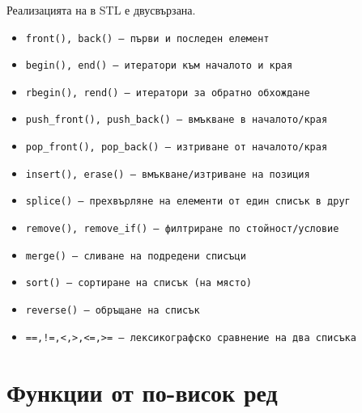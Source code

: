 \documentclass[alsotrans,beameroptions={aspectratio=169}]{beamerswitch}
\begin{document}
\begin{frame}
  \frametitle{}
  \footnotesize
  Реализацията на  в STL е двусвързана.
  \begin{itemize}
  \item \tt{front()}, \tt{back()} --- първи и последен елемент
  \item \tt{begin()}, \tt{end()} --- итератори към началото и края
  \item \tt{rbegin()}, \tt{rend()} --- итератори за обратно обхождане
  \item \tt{push\_front()}, \tt{push\_back()} --- вмъкване в началото/края
  \item \tt{pop\_front()}, \tt{pop\_back()} --- изтриване от началото/края
  \item \tt{insert()}, \tt{erase()} --- вмъкване/изтриване на позиция
  \item \tt{splice()} --- прехвърляне на елементи от един списък в друг
  \item \tt{remove()}, \tt{remove\_if()} --- филтриране по стойност/условие
  \item \tt{merge()} --- сливане на подредени списъци
  \item \tt{sort()} --- сортиране на списък (на място)
  \item \tt{reverse()} --- обръщане на списък
  \item \tt{==,!=,<,>,<=,>=} --- лексикографско сравнение на два списъка
  \end{itemize}
\end{frame}

\section{Функции от по-висок ред}
\end{document}
